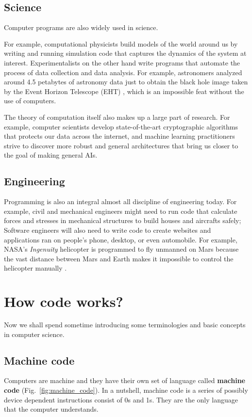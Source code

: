 \documentclass[a4paper,12pt]{article}
\begin{document}
\subsection{Science}
Computer programs are also widely used in science.

For example, computational physicists build models of the world around us by writing and running simulation code that captures the dynamics of the system at interest. Experimentalists on the other hand write programs that automate the process of data collection and data analysis. For example, astronomers analyzed around 4.5 petabytes of astronomy data just to obtain the black hole image taken by the Event Horizon Telescope (EHT) \cite{westerndigital:EHT_blackhole}, which is an impossible feat without the use of computers.

The theory of computation itself also makes up a large part of research. For example, computer scientists develop state-of-the-art cryptographic algorithms that protects our data across the internet, and machine learning practitioners strive to discover more robust and general architectures that bring us closer to the goal of making general AIs. 


\subsection{Engineering}
Programming is also an integral almost all discipline of engineering today. For example, civil and mechanical engineers might need to run code that calculate forces and stresses in mechanical structures to build houses and aircrafts safely; Software engineers will also need to write code to create websites and applications ran on people's phone, desktop, or even automobile. For example, NASA's \textit{Ingenuity} helicopter is programmed to fly unmanned on Mars because the vast distance between Mars and Earth makes it impossible to control the helicopter manually \cite{nasa:Ingenuity_Helicopter}.

\section{How code works?}
Now we shall spend sometime introducing some terminologies and basic concepts in computer science. 

\subsection{Machine code}
Computers are machine and they have their own set of language called \textbf{machine code} (Fig.~\ref{fig:machine_code}). In a nutshell, machine code is a series of possibly device dependent instructions consist of 0s and 1s. They are the only language that the computer understands.
\end{document}
